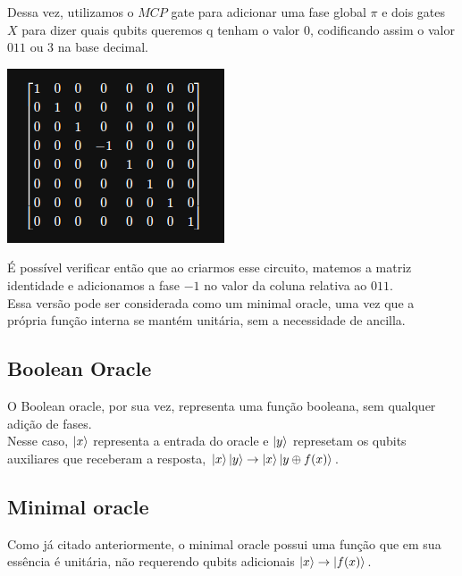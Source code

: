\documentclass{article}
\begin{document}
Dessa vez, utilizamos o $MCP$ gate para adicionar uma fase global $\pi$ e dois gates $X$ para dizer quais qubits queremos q tenham o valor 0, codificando assim o valor $011$ ou $3$ na base decimal.

\begin{center}
	\includegraphics[scale=0.5]{phase_oracle_unitary.png}
	\label{fig:phase-oracle-unitary}
\end{center}

É possível verificar então que ao criarmos esse circuito, matemos a matriz identidade e adicionamos a fase $-1$ no valor da coluna relativa ao $011$. \\
Essa versão pode ser considerada como um minimal oracle, uma vez que a própria função interna se mantém unitária, sem a necessidade de ancilla.


\subsection{Boolean Oracle}

O Boolean oracle, por sua vez, representa uma função booleana, sem qualquer adição de fases.\\
Nesse caso, $\mathinner{|{x}\rangle}$ representa a entrada do oracle e $\mathinner{|{y}\rangle}$ represetam os qubits auxiliares que receberam a resposta, $\mathinner{|{x}\rangle}\mathinner{|{y}\rangle} \to \mathinner{|{x}\rangle}\mathinner{|{y \oplus f(x)}\rangle}$.

\subsection{Minimal oracle}

Como já citado anteriormente, o minimal oracle possui uma função que em sua essência é unitária, não requerendo qubits adicionais $\mathinner{|{x}\rangle} \to \mathinner{|{f(x)}\rangle}$.
\end{document}
